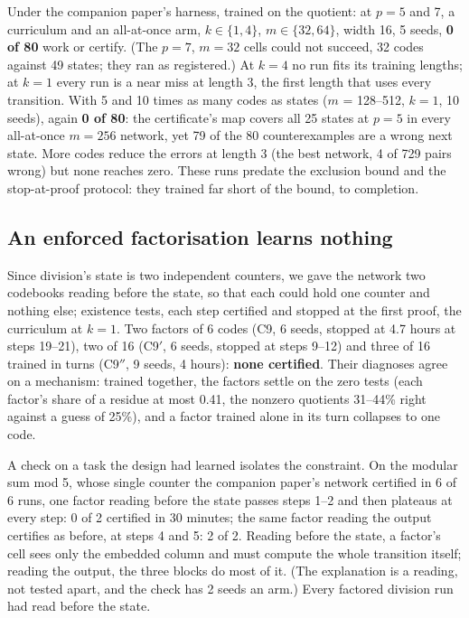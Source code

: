 \documentclass[11pt]{article}
\begin{document}
Under the companion paper's harness, trained on the quotient: at $p = 5$ and 7, a
curriculum and an all-at-once arm, $k \in \{1, 4\}$, $m \in \{32, 64\}$, width 16, 5 seeds,
\textbf{0 of 80} work or certify. (The $p = 7$, $m = 32$ cells could not succeed, 32 codes against 49
states; they ran as registered.) At $k = 4$ no run fits its training lengths; at $k = 1$ every run is
a near miss at length 3, the first length that uses every transition. With 5 and 10 times as many
codes as states ($m$ = 128--512, $k = 1$, 10 seeds), again \textbf{0 of 80}: the certificate's map
covers all 25 states at $p = 5$ in every all-at-once $m = 256$ network, yet 79 of the 80
counterexamples are a wrong next state. More codes reduce the errors at length 3 (the best network,
4 of 729 pairs wrong) but none reaches zero. These runs predate the exclusion bound and the
stop-at-proof protocol: they trained far short of the bound, to completion.

\subsection{An enforced factorisation learns nothing}
\label{sec:d10}

Since division's state is two independent counters, we gave the network two codebooks reading
before the state, so that each could hold one counter and nothing else; existence tests, each
step certified and stopped at the first proof, the curriculum at $k = 1$. Two factors of 6 codes
(C9, 6 seeds, stopped at 4.7 hours at steps 19--21), two of 16 (C9$'$, 6 seeds, stopped at steps
9--12) and three of 16 trained in turns (C9$''$, 9 seeds, 4 hours): \textbf{none certified}. Their
diagnoses agree on a mechanism: trained together, the factors settle on the zero tests (each factor's
share of a residue at most 0.41, the nonzero quotients 31--44\% right against a guess of
25\%), and a factor trained alone in its turn collapses to one code.

A check on a task the design had learned isolates the constraint. On the modular sum mod 5, whose
single counter the companion paper's network certified in 6 of 6 runs, one factor reading before the
state passes steps 1--2 and then plateaus at every step: 0 of 2 certified in 30 minutes; the same
factor reading the output certifies as before, at steps 4 and 5: 2 of 2. Reading before the state, a
factor's cell sees only the embedded column and must compute the whole transition itself; reading
the output, the three blocks do most of it. (The explanation is a reading, not tested apart, and the
check has 2 seeds an arm.) Every factored division run had read before the state.
\end{document}
